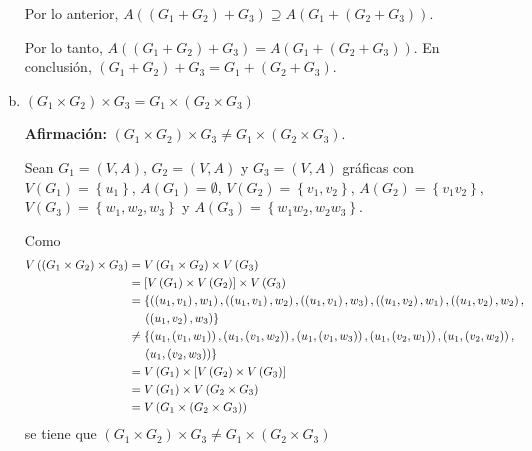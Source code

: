 \documentclass[fleqn]{article}
\begin{document}
\begin{enumerate}[a)]
        Por lo anterior, $ A \left( \left( G_1 + G_2 \right) + G_3 \right) \supseteq A \left( G_1 + \left( G_2 + G_3 \right) \right) $.

        Por lo tanto, $ A \left( \left( G_1 + G_2 \right) + G_3 \right) = A \left( G_1 + \left( G_2 + G_3 \right) \right) $. En conclusión, $ \left( G_1 + G_2 \right) + G_3 = G_1 + \left( G_2 + G_3 \right) $.
        
        \item $ \left( G_1 \times G_2 \right) \times G_3 = G_1 \times \left( G_2 \times G_3 \right) $
        
        \textbf{Afirmación:} $ \left( G_1 \times G_2 \right) \times G_3 \neq G_1 \times \left( G_2 \times G_3 \right) $.

        Sean $ G_1 = \left( V, A \right) $, $ G_2 = \left( V, A \right) $ y $ G_3 = \left( V, A \right) $ gráficas con $ V \left( G_1 \right) = \left\lbrace u_1 \right\rbrace $, $ A \left( G_1 \right) = \emptyset $, $ V \left( G_2 \right) = \left\lbrace v_1, v_2 \right\rbrace $, $ A \left( G_2 \right) = \left\lbrace v_1v_2 \right\rbrace $, $ V \left( G_3 \right) = \left\lbrace w_1, w_2, w_3 \right\rbrace $ y $ A \left( G_3 \right) = \left\lbrace w_1w_2, w_2w_3 \right\rbrace $. 

        Como
        \begin{align*}
            V \left( \left( G_1 \times G_2 \right) \times G_3 \right) &= V \left( G_1 \times G_2 \right) \times V \left( G_3 \right) \\
            & = \left[ V \left( G_1 \right) \times V \left( G_2 \right) \right] \times V \left( G_3 \right) \\
            & = \left\lbrace \left( \left( u_1, v_1 \right), w_1 \right), \left( \left( u_1, v_1 \right), w_2 \right), \left( \left( u_1, v_1 \right), w_3 \right), \left( \left( u_1, v_2 \right), w_1 \right), \left( \left( u_1, v_2 \right), w_2 \right), \right. \\
            & \hspace{4mm} \left. \left( \left( u_1, v_2 \right), w_3 \right) \right\rbrace \\
            & \neq \left\lbrace \left( u_1, \left( v_1, w_1 \right) \right), \left( u_1, \left( v_1, w_2 \right) \right), \left( u_1, \left( v_1, w_3 \right) \right), \left( u_1, \left( v_2, w_1 \right) \right), \left( u_1, \left( v_2, w_2 \right) \right), \right. \\
            & \hspace{4mm} \left. \left( u_1, \left( v_2, w_3 \right) \right) \right\rbrace \\
            & = V \left( G_1 \right) \times \left[ V \left( G_2 \right) \times V \left( G_3 \right) \right]\\
            & = V \left( G_1 \right) \times V \left( G_2 \times G_3 \right) \\
            & = V \left( G_1 \times \left( G_2 \times G_3 \right) \right)
        \end{align*} 
        se tiene que $ \left( G_1 \times G_2 \right) \times G_3 \neq G_1 \times \left( G_2 \times G_3 \right) $
    \end{enumerate}
\end{document}

